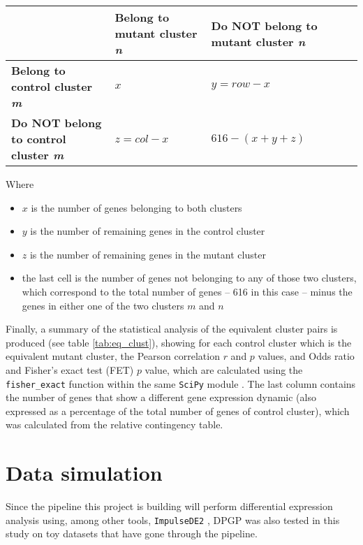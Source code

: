 \begin{center}
\begin{tabular}{>{\bfseries\centering}m{3.5cm} | >{\centering}m{3.5cm} | >{\centering}m{3.5cm} p{0pt}}
 & \textbf{Belong to mutant cluster \textit{n}} & \textbf{Do NOT belong to mutant cluster \textit{n}} & \\ \hline
Belong to control cluster \textit{m} & $x$ & $y=row - x$ & \\ \hline
Do NOT belong to control cluster \textit{m} & $z=col - x$ & $616 - (x+y+z)$ & \\
\end{tabular}
\end{center}

Where
\begin{itemize}
    \item $x$ is the number of genes belonging to both clusters
    \item $y$ is the number of remaining genes in the control cluster
    \item $z$ is the number of remaining genes in the mutant cluster
    \item the last cell is the number of genes not belonging to any of those two clusters, which correspond to the total number of genes -- \num{616} in this case -- minus the genes in either one of the two clusters $m$ and $n$ 
\end{itemize}

Finally, a summary of the statistical analysis of the equivalent cluster pairs is produced (see table \ref{tab:eq_clust}), showing for each control cluster which is the equivalent mutant cluster, the Pearson correlation $r$ and $p$ values, and Odds ratio and Fisher's exact test (FET) $p$ value, which are calculated using the \texttt{fisher\_exact} function within the same \texttt{SciPy} module \citep{virtanenSciPyFundamentalAlgorithms2020}. The last column contains the number of genes that show a different gene expression dynamic (also expressed as a percentage of the total number of genes of control cluster), which was calculated from the relative contingency table.

\section{Data simulation}
Since the pipeline this project is building will perform differential expression analysis using, among other tools, \texttt{ImpulseDE2} \citep{fischerImpulseModelbasedDifferential2018}, DPGP was also tested in this study on toy datasets that have gone through the pipeline. 
